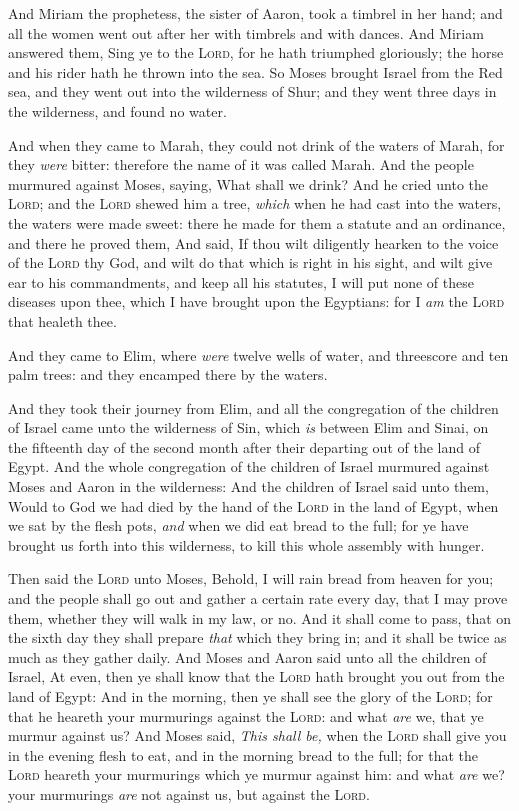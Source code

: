 \documentclass[11pt,letterpaper,oneside]{memoir}
\begin{document}
And Miriam the prophetess, the sister of Aaron, took a timbrel in her
hand; and all the women went out after her with timbrels and with
dances. And Miriam answered them, Sing ye to the \textsc{Lord}, for he
hath triumphed gloriously; the horse and his rider hath he thrown into
the sea. So Moses brought Israel from the Red sea, and they went out
into the wilderness of Shur; and they went three days in the wilderness,
and found no water.

And when they came to Marah, they could not drink of the waters of
Marah, for they \emph{were} bitter: therefore the name of it was called
Marah. And the people murmured against Moses, saying, What shall we
drink? And he cried unto the \textsc{Lord}; and the \textsc{Lord} shewed
him a tree, \emph{which} when he had cast into the waters, the waters
were made sweet: there he made for them a statute and an ordinance, and
there he proved them, And said, If thou wilt diligently hearken to the
voice of the \textsc{Lord} thy God, and wilt do that which is right in
his sight, and wilt give ear to his commandments, and keep all his
statutes, I will put none of these diseases upon thee, which I have
brought upon the Egyptians: for I \emph{am} the \textsc{Lord} that
healeth thee.

And they came to Elim, where \emph{were} twelve wells of water, and
threescore and ten palm trees: and they encamped there by the waters.

And they took their journey from Elim, and all the congregation of the
children of Israel came unto the wilderness of Sin, which \emph{is}
between Elim and Sinai, on the fifteenth day of the second month after
their departing out of the land of Egypt. And the whole congregation of
the children of Israel murmured against Moses and Aaron in the
wilderness: And the children of Israel said unto them, Would to God we
had died by the hand of the \textsc{Lord} in the land of Egypt, when we
sat by the flesh pots, \emph{and} when we did eat bread to the full; for
ye have brought us forth into this wilderness, to kill this whole
assembly with hunger.

Then said the \textsc{Lord} unto Moses, Behold, I will rain bread from
heaven for you; and the people shall go out and gather a certain rate
every day, that I may prove them, whether they will walk in my law, or
no. And it shall come to pass, that on the sixth day they shall prepare
\emph{that} which they bring in; and it shall be twice as much as they
gather daily. And Moses and Aaron said unto all the children of Israel,
At even, then ye shall know that the \textsc{Lord} hath brought you out
from the land of Egypt: And in the morning, then ye shall see the glory
of the \textsc{Lord}; for that he heareth your murmurings against the
\textsc{Lord}: and what \emph{are} we, that ye murmur against us? And
Moses said, \emph{This shall be,} when the \textsc{Lord} shall give you
in the evening flesh to eat, and in the morning bread to the full; for
that the \textsc{Lord} heareth your murmurings which ye murmur against
him: and what \emph{are} we? your murmurings \emph{are} not against us,
but against the \textsc{Lord}.
\end{document}
